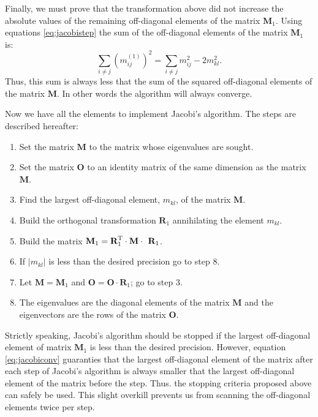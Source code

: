 Finally, we must prove that the transformation above did not
increase the absolute values of the remaining off-diagonal
elements of the matrix $\textbf{M}_1$. Using equations
\ref{eq:jacobistep} the sum of the off-diagonal elements of the
matrix $\textbf{M}_1$ is:
\begin{equation}
\label{eq:jacobiconv}
  \sum_{i\ne j}\left(m^{\left(1\right)}_{ij}\right)^2=\sum_{i\ne j}m_{ij}^2-2 m^2_{kl}.
\end{equation}
Thus, this sum is always less that the sum of the squared
off-diagonal elements of the matrix $\textbf{M}$. In other words the
algorithm will always converge.

 Now we have all the elements to
implement Jacobi's algorithm. The steps are described hereafter:
\begin{enumerate}
  \item Set the matrix $\textbf{M}$ to the matrix whose eigenvalues
  are sought.
  \item Set the matrix $\textbf{O}$ to an identity matrix of the same
  dimension as the matrix $\textbf{M}$.
  \item Find the largest off-diagonal element, $m_{kl}$, of the matrix $\textbf{
  M}$.
  \item Build the orthogonal transformation $\textbf{R}_1$
  annihilating the element $m_{kl}$.
  \item Build the matrix $\textbf{M}_1=\textbf{R}^{\mathop\textrm{T}}_1\cdot\textbf{M}\cdot\textbf{
  R}_1$.
  \item If $\left|m_{kl}\right|$ is less than the desired
  precision go to step 8.
  \item Let $\textbf{M}=\textbf{M}_1$ and $\textbf{O}=\textbf{O}\cdot\textbf{R}_1$; go to step 3.
  \item The eigenvalues are the diagonal elements of the matrix $\textbf{
  M}$ and the eigenvectors are the rows of the matrix $\textbf{O}$.
\end{enumerate}
Strictly speaking, Jacobi's algorithm should be stopped if the
largest off-diagonal element of matrix $\textbf{M}_1$ is less than
the desired precision. However, equation \ref{eq:jacobiconv}
guaranties that the largest off-diagonal element of the matrix
after each step of Jacobi's algorithm is always smaller that the
largest off-diagonal element of the matrix before the step. Thus.
the stopping criteria proposed above can safely be used. This
slight overkill prevents us from scanning the off-diagonal
elements twice per step.

